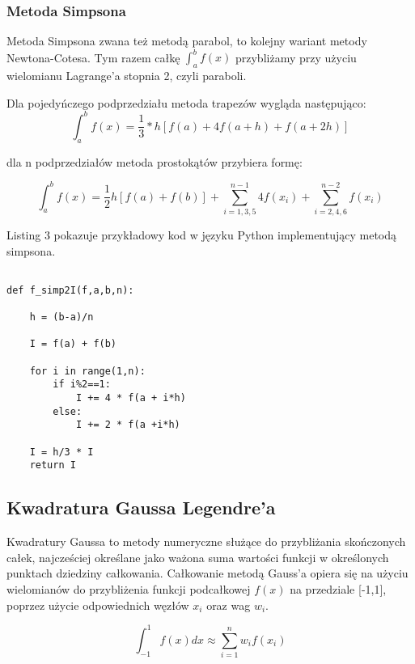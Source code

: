 \documentclass[12pt,twoside]{article}
\begin{document}
\subsubsection{Metoda Simpsona}
Metoda Simpsona zwana też metodą parabol, to kolejny wariant metody Newtona-Cotesa. Tym razem całkę $\int_a^b f(x)$ przybliżamy przy użyciu wielomianu Lagrange'a stopnia 2, czyli paraboli.

Dla pojedyńczego podprzedziału metoda trapezów wygląda następująco:
\begin{equation}
\int_a^b f(x) =  \frac{1}{3}*h[f(a) + 4f(a+h) + f(a+2h)]
\label{Eq:rownanie}
\end{equation}

dla n podprzedziałów metoda prostokątów przybiera formę:

\begin{equation}
\int_a^b f(x) =  \frac{1}{2}h {[f(a) + f(b)] + \sum_{i=1,3,5}^{n-1}4f(x_i) + \sum_{i=2,4,6}^{n-2} f(x_i) }
\label{Eq:rownanie}
\end{equation}

Listing 3 pokazuje przykładowy kod w języku Python implementujący metodą simpsona.

\begin{lstlisting}[caption={Kod w języku python implementujący metodę simpsona}]

def f_simp2I(f,a,b,n):

    h = (b-a)/n

    I = f(a) + f(b)

    for i in range(1,n):
        if i%2==1:
            I += 4 * f(a + i*h)
        else:
            I += 2 * f(a +i*h)

    I = h/3 * I
    return I

\end{lstlisting}
\label{Listing 2}

\subsection{Kwadratura Gaussa Legendre'a}
Kwadratury Gaussa to metody numeryczne służące do przybliżania skończonych całek, najcześciej określane jako ważona suma wartości funkcji w określonych punktach dziedziny całkowania.
Całkowanie metodą Gauss'a opiera się na użyciu wielomianów do przybliżenia funkcji podcałkowej $f(x)$ na przedziale [-1,1], poprzez użycie odpowiednich węzłów $x_i$ oraz wag $w_i$.
	
\begin{equation}
\int_{-1}^{1} f(x) dx \approx \sum_{i=1}^{n} w_if(x_i)
\label{Eq:Gauss}
\end{equation}
\end{document}
